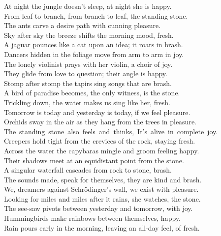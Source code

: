 At night the jungle doesn’t sleep, at night she is happy.\\
From leaf to branch, from branch to leaf, the standing stone.\\
The ants carve a desire path with cunning pleasure.\\
Sky after sky the breeze shifts the morning mood, fresh.\\
A jaguar pounces like a cat upon an idea; it roars in brash. \\
Dancers hidden in the foliage move from arm to arm in joy.\\[8pt plus 2pt]

The lonely violinist prays with her violin, a choir of joy.\\
They glide from love to question; their angle is happy.\\
Stomp after stomp the tapirs sing songs that are brash.\\
A bird of paradise becomes, the only witness, is the stone.\\
Trickling down, the water makes us sing like her, fresh.\\
Tomorrow is today and yesterday is today, if we feel pleasure.\\[8pt plus 2pt]

Orchids sway in the air as they hang from the trees in pleasure.\\
\mbox{The standing stone also feels and thinks, It’s alive in complete joy.}\\
Creepers hold tight from the crevices of the rock, staying fresh.\\
Across the water the capybaras mingle and groom feeling happy.\\
Their shadows meet at an equidistant point from the stone.\\
A singular waterfall cascades from rock to stone, brash.\\[8pt plus 2pt]

The sounds made, speak for themselves, they are kind and brash.\\
We, dreamers against Schrödinger’s wall, we exist with pleasure.\\
Looking for miles and miles after it rains, she watches, the stone.\\
The see-saw pivots between yesterday and tomorrow, with joy.\\
Hummingbirds make rainbows between themselves, happy.\\
Rain pours early in the morning, leaving an all-day feel, of fresh.\\[8pt plus 2pt]

